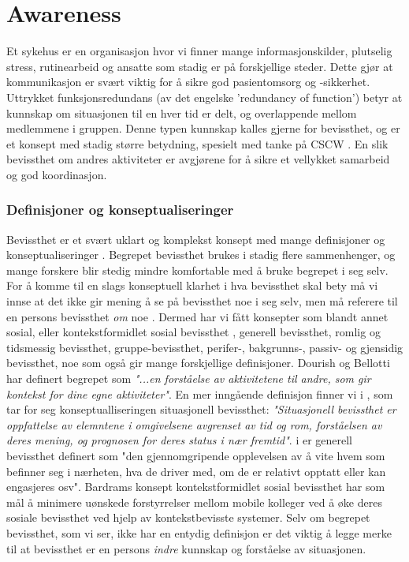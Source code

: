 \section{Awareness}
\label{chp: awareness}

Et sykehus er en organisasjon hvor vi finner mange informasjonskilder, plutselig stress, rutinearbeid og ansatte som stadig er på forskjellige steder. Dette gjør at kommunikasjon er svært viktig for å sikre god pasientomsorg og -sikkerhet\cite{Klemets12}. Uttrykket funksjonsredundans (av det engelske 'redundancy of function') betyr at kunnskap om situasjonen til en hver tid er delt, og overlappende mellom medlemmene i gruppen.\cite{KlemetsRedundancy} Denne typen kunnskap kalles gjerne for bevissthet, og er et konsept med stadig større betydning, spesielt med tanke på CSCW \cite{Dourish92}. En slik bevissthet om andres aktiviteter er avgjørene for å sikre et vellykket samarbeid og god koordinasjon\cite{KlemetsRedundancy}. 

\subsubsection{Definisjoner og konseptualiseringer}
Bevissthet er et svært uklart og komplekst konsept med mange definisjoner og konseptualiseringer \cite{KlemetsRedundancy}\cite{Gutwin04}\cite{Schmidt02}. Begrepet bevissthet brukes i stadig flere sammenhenger, og mange forskere blir stedig mindre komfortable med å bruke begrepet i seg selv. For å komme til en slags konseptuell klarhet i hva bevissthet skal bety må vi innse at det ikke gir mening å se på bevissthet noe i seg selv, men må referere til en persons bevissthet \emph{om} noe \cite{Schmidt02}. Dermed har vi fått konsepter som blandt annet sosial, eller kontekstformidlet sosial bevissthet \cite{Bardram04}, generell bevissthet\cite{Gross13}, romlig og tidsmessig bevissthet\cite{Randell}, gruppe-bevissthet\cite{Gutwin04}, perifer-, bakgrunns-, passiv- og gjensidig bevissthet\cite{Schmidt02}, noe som også gir mange forskjellige definisjoner. Dourish og Bellotti har definert begrepet som \emph{"...en forståelse av aktivitetene til andre, som gir kontekst for dine egne aktiviteter"}. En mer inngående definisjon finner vi i \cite{Endsly95}, som tar for seg konseptualliseringen situasjonell bevissthet: \emph{"Situasjonell bevissthet er oppfattelse av elemntene i omgivelsene avgrenset av tid og rom, forståelsen av deres mening, og prognosen for deres status i nær fremtid"}. i \cite{Gross13} er generell bevissthet definert som "den gjennomgripende opplevelsen av å vite hvem som befinner seg i nærheten, hva de driver med, om de er relativt opptatt eller kan engasjeres osv". Bardrams konsept kontekstformidlet sosial bevissthet har som mål å minimere uønskede forstyrrelser mellom mobile kolleger ved å øke deres sosiale bevissthet ved hjelp av kontekstbevisste systemer\cite{Bardram04}. Selv om begrepet bevissthet, som vi ser, ikke har en entydig definisjon er det viktig å legge merke til at bevissthet er en persons \emph{indre} kunnskap og forståelse av situasjonen\cite{Gross13}. 

